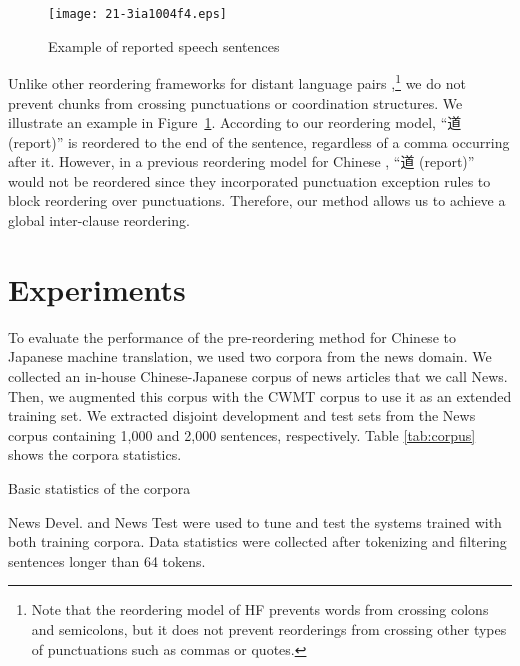 \documentclass[english]{jnlp_1.4}
\begin{document}
\begin{figure}[t]
\begin{center}
\texttt{[image: 21-3ia1004f4.eps]}
\end{center}
\caption{Example of reported speech sentences}
\label{fig:rs}
\end{figure}

Unlike other reordering frameworks for distant language pairs ,\footnote{
Note that the reordering model of HF \cite{HI2010} prevents words from crossing colons and semicolons,
but it does not prevent reorderings from crossing other types of punctuations such as commas or quotes.
}
we do not prevent chunks from crossing punctuations or coordination structures.
We illustrate an example in Figure~\ref{fig:rs}.
According to our reordering model, ``道 (report)'' is reordered to the end of the sentence,
regardless of a comma occurring after it.
However, in a previous reordering model for Chinese ,
``道 (report)'' would not be reordered since they incorporated punctuation exception rules
to block reordering over punctuations.
Therefore, our method allows us to achieve a global inter-clause reordering.


\section{Experiments}
\label{sec:exp}

To evaluate the performance of the pre-reordering method for Chinese 
to Japanese machine translation, we used two corpora from the news domain. We 
collected an in-house Chinese-Japanese corpus of news articles that we call News. 
Then, we augmented this corpus with the CWMT corpus \cite{CWMT2011} to use it as an 
extended training set. We extracted disjoint development and test sets from the News 
corpus containing 1,000 and 2,000 sentences, respectively. 
Table \ref{tab:corpus} shows the corpora statistics.

\begin{table}[b]
\caption{Basic statistics of the corpora}
\label{tab:corpus}
\vspace{8pt}

\vspace{4pt}
\small
News Devel. and News Test were used to tune and 
test the systems trained with both training corpora. Data statistics were collected 
after tokenizing and filtering sentences longer than 64 tokens.
\par
\end{table}
\end{document}
